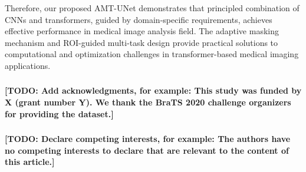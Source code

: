 \documentclass[runningheads]{llncs}
\begin{document}
Therefore, our proposed AMT-UNet demonstrates that principled combination of CNNs and transformers, guided by domain-specific requirements, achieves effective performance in medical image analysis field. The adaptive masking mechanism and ROI-guided multi-task design provide practical solutions to computational and optimization challenges in transformer-based medical imaging applications.

\begin{credits}
\subsubsection{\ackname}
\textbf{[TODO: Add acknowledgments, for example: This study was funded by X (grant number Y). We thank the BraTS 2020 challenge organizers for providing the dataset.]}

\subsubsection{\discintname}
\textbf{[TODO: Declare competing interests, for example: The authors have no competing interests to declare that are relevant to the content of this article.]}
\end{credits}

%
%


\end{document}
